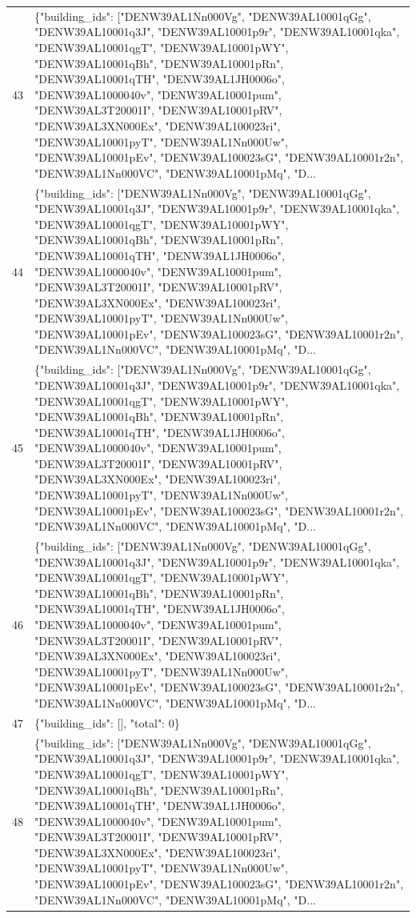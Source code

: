 \documentclass[a4paper,11pt]{article}
\begin{document}
\begin{table}[ht]
\begin{tabular}{r p{12cm}}
43 & \{"building\_ids": ["DENW39AL1Nn000Vg", "DENW39AL10001qGg", "DENW39AL10001q3J", "DENW39AL10001p9r", "DENW39AL10001qka", "DENW39AL10001qgT", "DENW39AL10001pWY", "DENW39AL10001qBh", "DENW39AL10001pRn", "DENW39AL10001qTH", "DENW39AL1JH0006o", "DENW39AL1000040v", "DENW39AL10001pum", "DENW39AL3T20001I", "DENW39AL10001pRV", "DENW39AL3XN000Ex", "DENW39AL100023ri", "DENW39AL10001pyT", "DENW39AL1Nn000Uw", "DENW39AL10001pEv", "DENW39AL100023sG", "DENW39AL10001r2n", "DENW39AL1Nn000VC", "DENW39AL10001pMq", "D... \\
44 & \{"building\_ids": ["DENW39AL1Nn000Vg", "DENW39AL10001qGg", "DENW39AL10001q3J", "DENW39AL10001p9r", "DENW39AL10001qka", "DENW39AL10001qgT", "DENW39AL10001pWY", "DENW39AL10001qBh", "DENW39AL10001pRn", "DENW39AL10001qTH", "DENW39AL1JH0006o", "DENW39AL1000040v", "DENW39AL10001pum", "DENW39AL3T20001I", "DENW39AL10001pRV", "DENW39AL3XN000Ex", "DENW39AL100023ri", "DENW39AL10001pyT", "DENW39AL1Nn000Uw", "DENW39AL10001pEv", "DENW39AL100023sG", "DENW39AL10001r2n", "DENW39AL1Nn000VC", "DENW39AL10001pMq", "D... \\
45 & \{"building\_ids": ["DENW39AL1Nn000Vg", "DENW39AL10001qGg", "DENW39AL10001q3J", "DENW39AL10001p9r", "DENW39AL10001qka", "DENW39AL10001qgT", "DENW39AL10001pWY", "DENW39AL10001qBh", "DENW39AL10001pRn", "DENW39AL10001qTH", "DENW39AL1JH0006o", "DENW39AL1000040v", "DENW39AL10001pum", "DENW39AL3T20001I", "DENW39AL10001pRV", "DENW39AL3XN000Ex", "DENW39AL100023ri", "DENW39AL10001pyT", "DENW39AL1Nn000Uw", "DENW39AL10001pEv", "DENW39AL100023sG", "DENW39AL10001r2n", "DENW39AL1Nn000VC", "DENW39AL10001pMq", "D... \\
46 & \{"building\_ids": ["DENW39AL1Nn000Vg", "DENW39AL10001qGg", "DENW39AL10001q3J", "DENW39AL10001p9r", "DENW39AL10001qka", "DENW39AL10001qgT", "DENW39AL10001pWY", "DENW39AL10001qBh", "DENW39AL10001pRn", "DENW39AL10001qTH", "DENW39AL1JH0006o", "DENW39AL1000040v", "DENW39AL10001pum", "DENW39AL3T20001I", "DENW39AL10001pRV", "DENW39AL3XN000Ex", "DENW39AL100023ri", "DENW39AL10001pyT", "DENW39AL1Nn000Uw", "DENW39AL10001pEv", "DENW39AL100023sG", "DENW39AL10001r2n", "DENW39AL1Nn000VC", "DENW39AL10001pMq", "D... \\
47 & \{"building\_ids": [], "total": 0\} \\
48 & \{"building\_ids": ["DENW39AL1Nn000Vg", "DENW39AL10001qGg", "DENW39AL10001q3J", "DENW39AL10001p9r", "DENW39AL10001qka", "DENW39AL10001qgT", "DENW39AL10001pWY", "DENW39AL10001qBh", "DENW39AL10001pRn", "DENW39AL10001qTH", "DENW39AL1JH0006o", "DENW39AL1000040v", "DENW39AL10001pum", "DENW39AL3T20001I", "DENW39AL10001pRV", "DENW39AL3XN000Ex", "DENW39AL100023ri", "DENW39AL10001pyT", "DENW39AL1Nn000Uw", "DENW39AL10001pEv", "DENW39AL100023sG", "DENW39AL10001r2n", "DENW39AL1Nn000VC", "DENW39AL10001pMq", "D... \\

\end{tabular}
\end{table}
\end{document}

